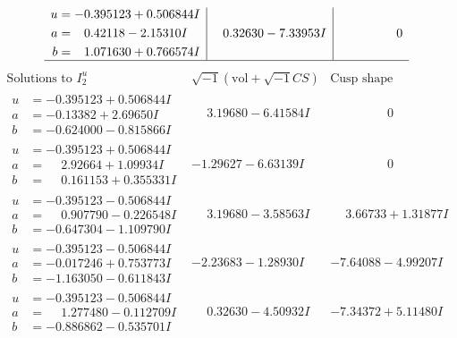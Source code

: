 \documentclass[1p]{elsarticle_modified}
\theoremstyle{definition}
\newcommand{\I}{\sqrt{-1}}
\begin{document}
$$\begin{array}{c|c|c}
\begin{aligned}
u &= -0.395123 + 0.506844 I \\
a &= \phantom{-}0.42118 - 2.15310 I \\
b &= \phantom{-}1.071630 + 0.766574 I\end{aligned}
 & \phantom{-}0.32630 - 7.33953 I & \phantom{-0.000000 } 0\\
 \hline 
 \end{array}$$\newpage$$\begin{array}{c|c|c}  
\text{Solutions to }I^u_{2}& \I (\text{vol} + \sqrt{-1}CS) & \text{Cusp shape}\\
 \hline 
\begin{aligned}
u &= -0.395123 + 0.506844 I \\
a &= -0.13382 + 2.69650 I \\
b &= -0.624000 - 0.815866 I\end{aligned}
 & \phantom{-}3.19680 - 6.41584 I & \phantom{-0.000000 } 0 \\ \hline\begin{aligned}
u &= -0.395123 + 0.506844 I \\
a &= \phantom{-}2.92664 + 1.09934 I \\
b &= \phantom{-}0.161153 + 0.355331 I\end{aligned}
 & -1.29627 - 6.63139 I & \phantom{-0.000000 } 0 \\ \hline\begin{aligned}
u &= -0.395123 - 0.506844 I \\
a &= \phantom{-}0.907790 - 0.226548 I \\
b &= -0.647304 - 1.109790 I\end{aligned}
 & \phantom{-}3.19680 - 3.58563 I & \phantom{-}3.66733 + 1.31877 I \\ \hline\begin{aligned}
u &= -0.395123 - 0.506844 I \\
a &= -0.017246 + 0.753773 I \\
b &= -1.163050 - 0.611843 I\end{aligned}
 & -2.23683 - 1.28930 I & -7.64088 - 4.99207 I \\ \hline\begin{aligned}
u &= -0.395123 - 0.506844 I \\
a &= \phantom{-}1.277480 - 0.112709 I \\
b &= -0.886862 - 0.535701 I\end{aligned}
 & \phantom{-}0.32630 - 4.50932 I & -7.34372 + 5.11480 I \\ \hline\begin{aligned}

\end{aligned}
\end{array}$$
\end{document}
